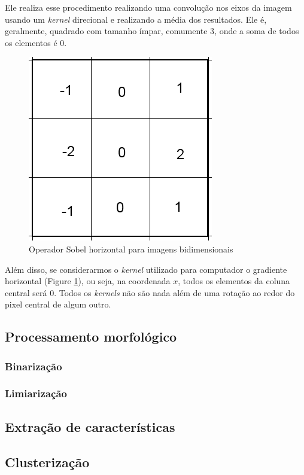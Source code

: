 \documentclass[10pt,twocolumn,letterpaper]{article}
\begin{document}
	Ele realiza esse procedimento realizando uma convolução nos eixos da imagem
usando um \emph{kernel} direcional e realizando a média dos resultados. Ele é,
geralmente, quadrado com tamanho ímpar, comumente 3, onde a soma de todos
os elementos é 0.

\begin{figure}[!htp]
\centering
\includegraphics[width=0.5\columnwidth]{SobelGx}
\caption{Operador Sobel horizontal para imagens bidimensionais}
\label{fig:SobelGx}
\end{figure}

Além disso, se considerarmos o \emph{kernel} utilizado para computador o gradiente horizontal (Figure \ref{fig:SobelGx}), ou seja, na coordenada $x$, todos os elementos da coluna central será 0. Todos os \emph{kernels} não são nada além de uma rotação ao redor do pixel central de algum outro.

\subsection{Processamento morfológico}

\subsubsection{Binarização}

\subsubsection{Limiarização}

\subsection{Extração de características}

\subsection{Clusterização}
\end{document}
